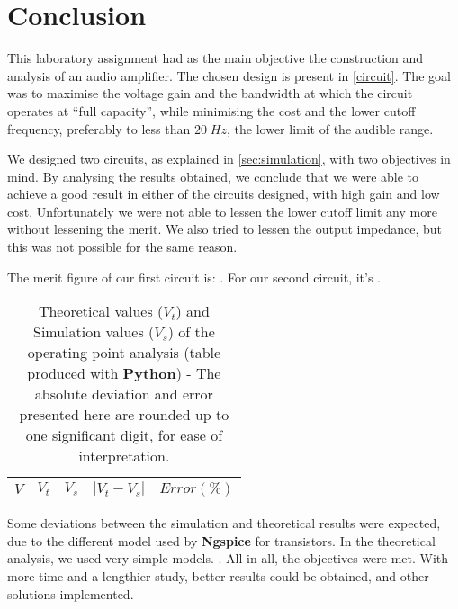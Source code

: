 \section{Conclusion}
\label{sec:conclusion}

This laboratory assignment had as the main objective the construction and analysis of an audio amplifier. The chosen design is present in \ref{circuit}. The goal was to maximise the voltage gain and the bandwidth at which the circuit operates at ``full capacity'', while minimising the cost and the lower cutoff frequency, preferably to less than $20\;Hz$, the lower limit of the audible range.

We designed two circuits, as explained in \ref{sec:simulation}, with two objectives in mind. By analysing the results obtained, we conclude that we were able to achieve a good result in either of the circuits designed, with high gain and low cost. Unfortunately we were not able to lessen the lower cutoff limit any more without lessening the merit. We also tried to lessen the output impedance, but this was not possible for the same reason.

The merit figure of our first circuit is: . For our second circuit, it's .


\begin{table}[H]
  \centering
  \begin{tabular}{|c|c|c|c|c|}
    \hline
        $V$ & $V_t$ & $V_s$ & $|V_t-V_s|$ & $Error (\%)$ \\
        \hline
        \hline
        
        \hline
  \end{tabular}
  \caption{Theoretical values ($V_t$) and Simulation values ($V_s$) of the operating point analysis (table produced with {\bf Python})  - The absolute deviation and error presented here are rounded up to one significant digit, for ease of interpretation.}
  \label{error1_res}
\end{table}


Some deviations between the simulation and theoretical results were expected, due to the different model used by {\bf Ngspice} for transistors. In the theoretical analysis, we used very simple models.
. 
All in all, the objectives were met. With more time and a lengthier study, better results could be obtained, and other solutions implemented.
